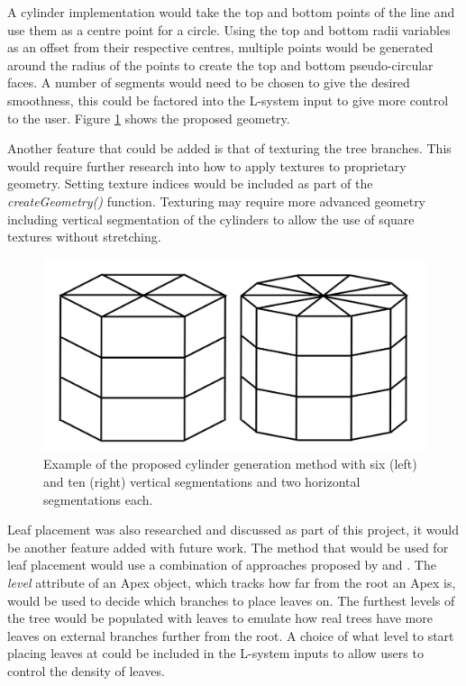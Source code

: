 \documentclass[final]{cmpreport}
\begin{document}
A cylinder implementation would 
take the top and bottom points of the line and use them as a centre point for a circle. Using the 
top and bottom radii variables as an offset from their respective centres, multiple points would 
be generated around the radius of the points to create the top and bottom pseudo-circular faces. 
A number of segments would need to be chosen to give the desired smoothness, this could be factored 
into the L-system input to give more control to the user. Figure \ref{fig:ex-cylinder} shows the 
proposed geometry.

Another feature that could be added is that of texturing the tree branches. This would require 
further research into how to apply textures to proprietary geometry. Setting texture indices would be 
included as part of the \emph{createGeometry()} function. Texturing may require more advanced geometry 
including vertical segmentation of the cylinders to allow the use of square textures without stretching.

\begin{figure}[ht]
    \includegraphics[scale=0.4]{ex-cylinder.PNG} 
    \centering
    \captionsetup{justification=centering}
    \caption{Example of the proposed cylinder generation method with six (left) and ten (right) vertical 
             segmentations and two horizontal segmentations each.}
    \label{fig:ex-cylinder}
\end{figure}

Leaf placement was also researched and discussed as part of this project, it would be another feature 
added with future work. The method that would be used for leaf placement would use a combination of 
approaches proposed by \cite{weber1995rendering} and \cite{bloomenthal1985modeling}. The \emph{level} 
attribute of an Apex object, which tracks how far from the root an Apex is, would be used to decide 
which branches to place leaves on. The furthest levels of the tree would be populated with leaves to 
emulate how real trees have more leaves on external branches further from the root. A choice of what 
level to start placing leaves at could be included in the L-system inputs to allow users to control 
the density of leaves. 
\end{document}
